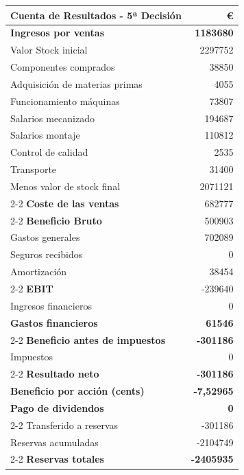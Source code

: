 
\begin{table}[h]
    \centering
    \begin{tabular}{lr}
        \textbf{Cuenta de Resultados - 5ª Decisión} & \textbf{€} \\
        \hline
        \textbf{Ingresos por ventas}                & \textbf{1183680} \\
        Valor Stock inicial                         & 2297752 \\
        Componentes comprados                       & 38850 \\
        Adquisición de materias primas              & 4055 \\
        Funcionamiento máquinas                     & 73807 \\
        Salarios mecanizado                         & 194687 \\
        Salarios montaje                            & 110812 \\
        Control de calidad                          & 2535 \\
        Transporte                                  & 31400 \\
        Menos valor de stock final                  & 2071121 \\
        \cline{2-2}
        \textbf{Coste de las ventas}                & 682777 \\
        \cline{2-2}
        \textbf{Beneficio Bruto}                    & 500903 \\
        Gastos generales                            & 702089 \\
        Seguros recibidos                           & 0 \\
        Amortización                                & 38454 \\
        \cline{2-2}
        \textbf{EBIT}                               & -239640 \\
        Ingresos financieros                        & 0 \\
        \textbf{Gastos financieros}                 & \textbf{61546} \\
        \cline{2-2}
        \textbf{Beneficio antes de impuestos}       & \textbf{-301186} \\
        Impuestos                                   & 0 \\
        \cline{2-2}
        \textbf{Resultado neto}                     & \textbf{-301186} \\
        \textbf{Beneficio por acción (cents)}       & \textbf{-7,52965} \\
        \textbf{Pago de dividendos}                 & \textbf{0} \\
        \cline{2-2}
        Transferido a reservas                      & -301186 \\
        Reservas acumuladas                         & -2104749 \\
        \cline{2-2}
        \textbf{Reservas totales}                   & \textbf{-2405935}
    \end{tabular}
\end{table}

